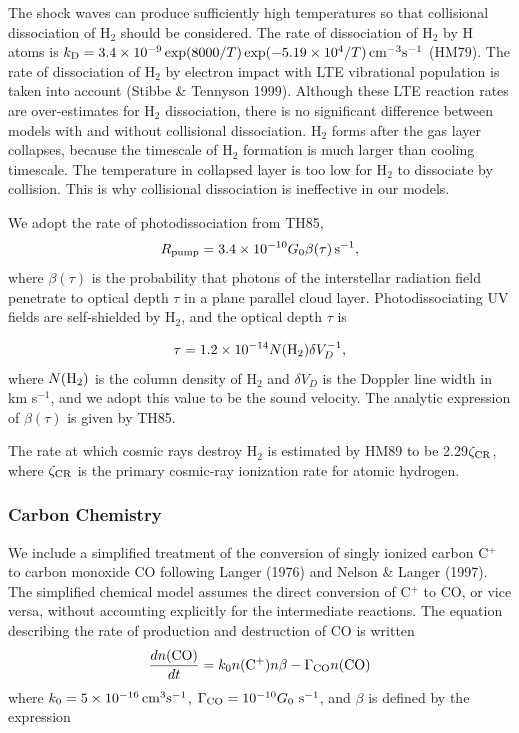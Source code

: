 The shock waves can produce sufficiently high temperatures
so that collisional dissociation of H$_2$ should be considered.
The rate of dissociation of H$_2$ by H atoms is 
$k_{\rm D}=3.4\times 10^{-9}\exp(8000/T)\exp(-5.19\times 10^4/T)
\, {\rm cm^{-3}s^{-1}}$ (HM79).
The rate of dissociation of H$_2$ by electron impact with LTE
vibrational population is taken into account (Stibbe \& Tennyson 1999). 
Although these LTE reaction rates are over-estimates for H$_2$ dissociation,
there is no significant difference between models with and without 
collisional dissociation.
H$_2$ forms after the gas layer collapses,
because the timescale of H$_2$ formation is much larger than
cooling timescale. 
The temperature in collapsed layer is too low for H$_2$ to 
dissociate by collision. 
This is why collisional dissociation is ineffective
in our models.


We adopt the rate of photodissociation from TH85,
\begin{equation}
R_{\rm pump}=3.4\times 10^{-10}G_0\beta(\tau)\,{\rm s^{-1}},
\end{equation}
where $\beta(\tau)$ is the probability that
photons of the interstellar radiation field penetrate to optical depth $\tau$ 
in a plane parallel cloud layer.
Photodissociating UV fields are self-shielded by H$_2$,
and the optical depth $\tau$ is 

\begin{equation}
\tau=1.2\times 10^{-14}N({\rm H_2})\delta V_D^{-1},
\end{equation}
where $N({\rm H_2})$ is the column density of H$_2$ and
$\delta V_D$ is the Doppler line width in km s$^{-1}$,
and we adopt this value to be the sound velocity.
The analytic expression of $\beta(\tau)$ is given by TH85.

The rate at which cosmic rays destroy H$_2$
is estimated by HM89 to be 
2.29$\zeta_{\rm CR}$, where $\zeta_{\rm CR}$ is the 
primary cosmic-ray ionization rate for atomic hydrogen.

\subsubsection{Carbon Chemistry}
We include a simplified treatment of the conversion of 
singly ionized carbon C$^{+}$ to carbon monoxide CO
following Langer (1976) and Nelson \& Langer (1997).
The simplified chemical model assumes the direct conversion 
of C$^+$ to CO, or vice versa, without accounting explicitly 
for the intermediate reactions.
The equation describing the rate of production and destruction 
of CO is written
\begin{equation}
\frac{dn({\rm CO})}{dt}=
k_0n({\rm C^+})n\beta-\Gamma_{\rm CO}n({\rm CO})
\end{equation}
where $k_0=5\times 10^{-16}\,{\rm cm^3 s^{-1}}$, 
$\Gamma_{\rm CO}=10^{-10}G_0\ {\rm s^{-1}}$, 
and $\beta$ is defined by the expression


